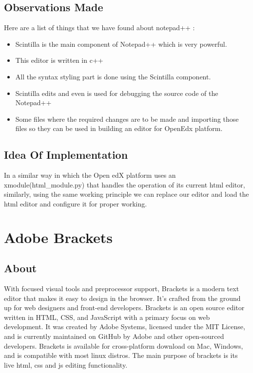 \subsection{Observations Made} 
Here are a list of things that we have found about notepad++ : 
\begin{itemize}
\item Scintilla is the main component of Notepad++ which is very powerful.
\item This editor is written in c++
\item All the syntax styling part is done using the Scintilla component.
\item Scintilla edits and even is used for debugging the source code of the Notepad++
\item Some files where the required changes are to be made and importing those files so they can
be used in building an editor for OpenEdx platform. \newline
\end{itemize}  

\subsection{Idea Of Implementation }
In a similar way in which the Open edX platform uses an xmodule(html\_module.py) that
handles the operation of its current html editor, similarly, using the same working principle
we can replace our editor and load the html editor and configure it for proper working.  
\section{Adobe Brackets}
\subsection{About}
With focused visual tools and preprocessor support, Brackets is a modern text editor that
makes it easy to design in the browser. It's crafted from the ground up for web designers and
front-end developers. \newline 
Brackets is an open source editor written in HTML, CSS, and JavaScript with a primary
focus on web development. It was created by Adobe Systems, licensed under the MIT
License, and is currently maintained on GitHub by Adobe and other open-sourced
developers. Brackets is available for cross-platform download on Mac, Windows, and is
compatible with most linux distros. The main purpose of brackets is its live html, css and js
editing functionality.
